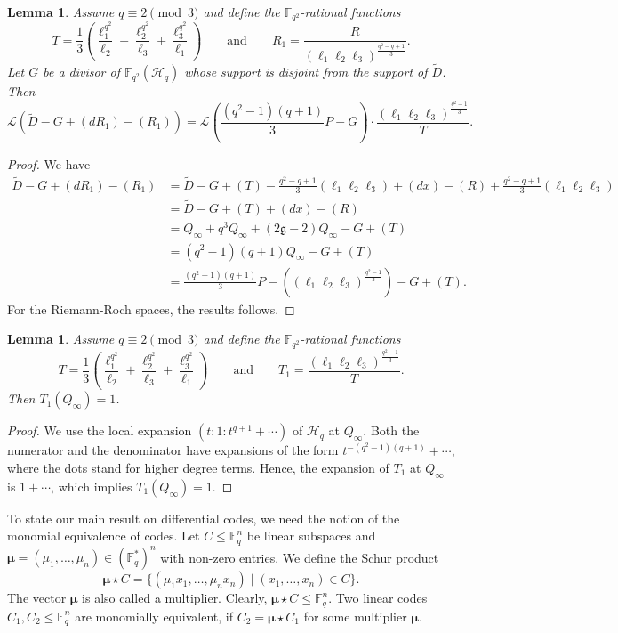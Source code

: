 \documentclass[11pt]{amsart}
\theoremstyle{plain}
\newtheorem{lemma}[theorem]{Lemma}
\theoremstyle{definition}
\theoremstyle{remark}
\newcommand{\g}{\mathfrak{g}}
\begin{document}
\begin{lemma} \label{lm:tildeD-riemann-roch}
Assume $q\equiv 2 \pmod3$ and define the $\mathbb{F}_{q^2}$-rational functions 
\[T=\frac{1}{3}\left(\frac{\ell_1^{q^2}}{\ell_2} + \frac{\ell_2^{q^2}}{\ell_3} + \frac{\ell_3^{q^2}}{\ell_1}\right) \qquad \text{and} \qquad R_1=\frac{R}{(\ell_1\ell_{2}\ell_{3})^{\frac{q^2-q+1}{3}}}.\]
Let $G$ be a divisor of $\mathbb{F}_{q^2}(\mathscr{H}_q)$ whose support is disjoint from the support of $\tilde{D}$. Then
\[\mathscr{L}(\tilde{D}-G+(dR_1)-(R_1)) = \mathscr{L}\left( \frac{(q^2-1)(q+1)}{3} P -  G\right) \cdot \frac{(\ell_1\ell_{2}\ell_{3})^{\frac{q^2-1}{3}}}{T}.\]
\end{lemma}
\begin{proof}
We have
\begin{align*}
\tilde{D}-G+(dR_1)-(R_1) &= \tilde{D}-G+(T)-\frac{q^2-q+1}{3}(\ell_1\ell_2\ell_3)+(dx)-(R)+\frac{q^2-q+1}{3}(\ell_1\ell_2\ell_3) \\
&= \tilde{D}-G+(T)+(dx)-(R)\\
&= Q_\infty + q^3 Q_\infty +(2\g-2)Q_\infty-G+(T)\\
&= (q^2-1)(q+1)Q_\infty -G+(T)\\
&= \frac{(q^2-1)(q+1)}{3}P-\left((\ell_1\ell_{2}\ell_{3})^{\frac{q^2-1}{3}}\right) -G+(T).
\end{align*}
For the Riemann-Roch spaces, the results follows. 
\end{proof}

\begin{lemma} \label{lm:T1-at-Qinfty}
Assume $q\equiv 2 \pmod3$ and define the $\mathbb{F}_{q^2}$-rational functions 
\[T=\frac{1}{3}\left(\frac{\ell_1^{q^2}}{\ell_2} + \frac{\ell_2^{q^2}}{\ell_3} + \frac{\ell_3^{q^2}}{\ell_1}\right) \qquad \text{and} \qquad T_1=\frac{(\ell_1\ell_{2}\ell_{3})^{\frac{q^2-1}{3}}}{T}.\]
Then $T_1(Q_\infty)=1$. 
\end{lemma}
\begin{proof}
We use the local expansion $(t:1:t^{q+1}+\cdots)$ of $\mathscr{H}_q$ at $Q_\infty$. Both the numerator and the denominator have expansions of the form $t^{-(q^2-1)(q+1)}+\cdots$, where the dots stand for higher degree terms. Hence, the expansion of $T_1$ at $Q_\infty$ is $1+\cdots$, which implies $T_1(Q_\infty)=1$. 
\end{proof}

To state our main result on differential codes, we need the notion of the monomial equivalence of codes. Let $C \leq \mathbb{F}_q^n$ be linear subspaces and $\boldsymbol{\mu}=(\mu_1,\ldots,\mu_n) \in (\mathbb{F}_q^*)^n$ with non-zero entries. We define the Schur product
\[\boldsymbol{\mu} \star C = \{(\mu_1x_1, \ldots,\mu_nx_n) \mid (x_1,\ldots,x_n) \in C\}.\]
The vector $\boldsymbol{\mu}$ is also called a multiplier. Clearly, $\boldsymbol{\mu} \star C\leq \mathbb{F}_q^n$. Two linear codes $C_1,C_2 \leq \mathbb{F}_q^n$ are monomially equivalent, if $C_2=\boldsymbol{\mu} \star C_1$ for some multiplier $\boldsymbol{\mu}$. 
\end{document}
